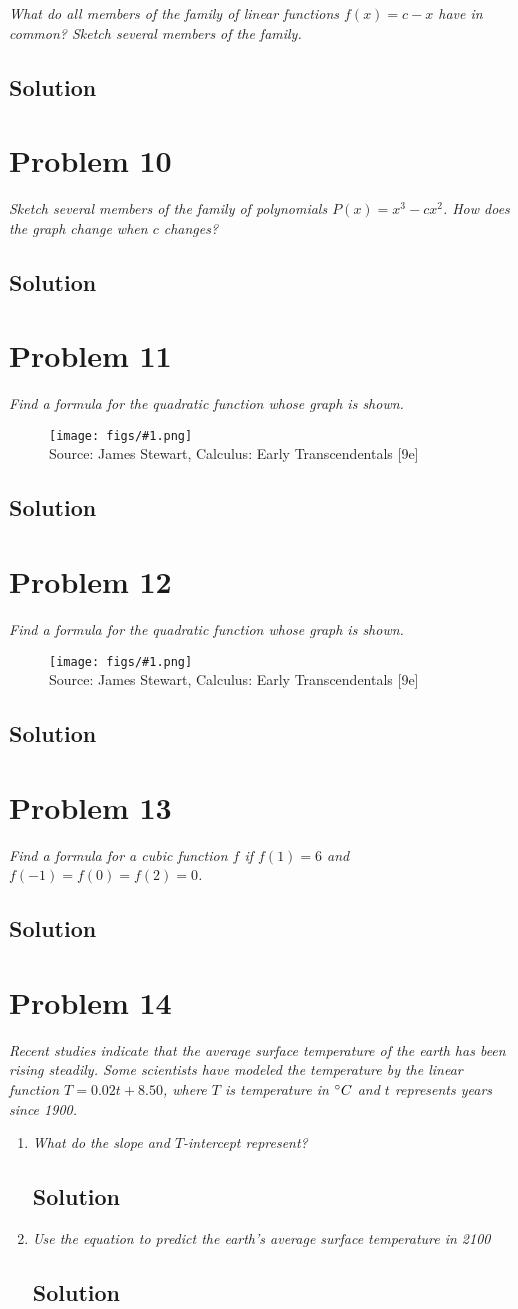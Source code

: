 \documentclass[11pt]{article}
\newcommand{\soln}{\subsection*}
\newcommand{\qn}{\textit}
\newcommand{\imagesource}[1]{{\footnotesize Source: #1}}
\newcommand{\imgqn}[1]{
	\begin{figure}[H]
		\centering
		\texttt{[image: figs/\#1.png]}\\
		\imagesource{James Stewart, Calculus: Early Transcendentals [9e]}
	\end{figure}
}
\begin{document}
\qn{What do all members of the family of linear functions $f(x)=c-x$ have in common? Sketch several members of the family.}

\soln{Solution}

\section*{Problem 10}

\qn{Sketch several members of the family of polynomials $P(x)=x^3-cx^2$. How does the graph change when $c$ changes?}

\soln{Solution}

\section*{Problem 11}

\qn{Find a formula for the quadratic function whose graph is shown.}

\imgqn{1.2.11}

\soln{Solution}

\section*{Problem 12}

\qn{Find a formula for the quadratic function whose graph is shown.}

\imgqn{1.2.12}

\soln{Solution}

\section*{Problem 13}

\qn{Find a formula for a cubic function $f$ if $f(1)=6$ and $f(-1)=f(0)=f(2)=0$.}

\soln{Solution}

\section*{Problem 14}

\qn{Recent studies indicate that the average surface temperature of the earth has been rising steadily. Some scientists have modeled the temperature by the linear function $T=0.02t+8.50$, where $T$ is temperature in $\degree C$ and $t$ represents years since 1900.}

\begin{enumerate}
	\item \qn{What do the slope and $T$-intercept represent?}
	\soln{Solution}
	
	\item \qn{Use the equation to predict the earth's average surface temperature in 2100}
	\soln{Solution}
\end{enumerate}
\end{document}
